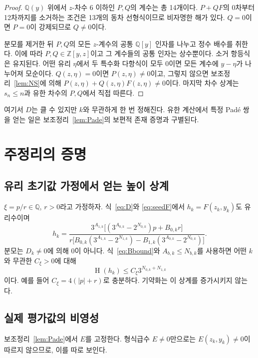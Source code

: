 \documentclass[11pt,a4paper]{article}
\theoremstyle{koreanplain}
\newcommand{\Q}{\mathbb Q}
\newcommand{\Z}{\mathbb Z}
\newcommand{\htQ}{\operatorname{H}}
\begin{document}
\begin{proof}
$\Q(y)$ 위에서 $z$-차수 6 이하인 $P,Q$의 계수는 총 14개이다. $P+QF$의 0차부터 12차까지를 소거하는 조건은 13개의 동차 선형식이므로 비자명한 해가 있다. $Q=0$이면 $P=0$이 강제되므로 $Q\ne0$이다.

분모를 제거한 뒤 $P,Q$의 모든 $z$-계수의 공통 $\Q[y]$ 인자를 나누고 정수 배수를 취한다. 이에 따라 $P,Q\in\Z[y,z]$이고 그 계수들의 공통 인자는 상수뿐이다. 소거 항등식은 유지된다. 어떤 유리 $\eta$에서 두 특수화 다항식이 모두 0이면 모든 계수에 $y-\eta$가 나누어져 모순이다. $Q(z,\eta)=0$이면 $P(z,\eta)\ne0$이고, 그렇지 않으면 보조정리~\ref{lem:NS}에 의해 $P(z,\eta)+Q(z,\eta)F(z,\eta)\ne0$이다. 마지막 차수 상계는 $s_n\le n$과 유한 차수의 $P,Q$에서 직접 따른다.
\end{proof}

여기서 $D$는 클 수 있지만 $k$와 무관하게 한 번 정해진다. 유한 계산에서 특정 Padé 쌍을 얻는 일은 보조정리~\ref{lem:Pade}의 보편적 존재 증명과 구별된다.

\section{주정리의 증명}

\subsection{유리 초기값 가정에서 얻는 높이 상계}

$\xi=p/r\in\Q$, $r>0$라고 가정하자. 식~\eqref{eq:D}와 \eqref{eq:seedF}에서 $h_k=F(z_k,y_k)$도 유리수이며
\begin{equation}\label{eq:hk}
h_k=
\frac{3^{A_{1,k}}\bigl[(3^{A_{0,k}}-2^{N_{0,k}})p+B_{0,k}r\bigr]}
{r\bigl[B_{0,k}(3^{A_{1,k}}-2^{N_{1,k}})-B_{1,k}(3^{A_{0,k}}-2^{N_{0,k}})\bigr]}.
\end{equation}
분모는 $D_k\ne0$에 의해 0이 아니다. 식~\eqref{eq:Bbound}와 $A_{b,k}\le N_{b,k}$를 사용하면 어떤 $k$와 무관한 $C_\xi>0$에 대해
\begin{equation}\label{eq:hheight}
\htQ(h_k)\le C_\xi 3^{N_{0,k}+N_{1,k}}
\end{equation}
이다. 예를 들어 $C_\xi=4(|p|+r)$로 충분하다. 기약화는 이 상계를 증가시키지 않는다.

\subsection{실제 평가값의 비영성}

보조정리~\ref{lem:Pade}에서 $E$를 고정한다. 형식급수 $E\ne0$만으로는 $E(z_k,y_k)\ne0$이 따르지 않으므로, 이를 따로 보인다.
\end{document}
